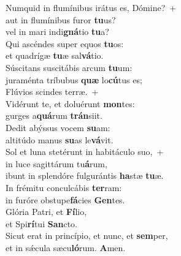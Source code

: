 \evenverse Numquid in flumínibus irátus es, Dómine?~+\\\evenverse  aut in flumínibus furor \textbf{tu}us?~\*\\
\evenverse vel in mari indi\textbf{gná}tio \textbf{tu}a?\\
\oddverse Qui ascéndes super equos \textbf{tu}os:~\*\\
\oddverse et quadrígæ \textbf{tu}æ sal\textbf{vá}tio.\\
\evenverse Súscitans suscitábis arcum \textbf{tu}um:~\*\\
\evenverse juraménta tríbubus \textbf{quæ} lo\textbf{cú}tus es;\\
\oddverse Flúvios scindes terræ.~+\\
\oddverse  Vidérunt te, et doluérunt \textbf{mon}tes:~\*\\
\oddverse gurges a\textbf{quá}rum \textbf{trán}siit.\\
\evenverse Dedit abýssus vocem \textbf{su}am:~\*\\
\evenverse altitúdo manus \textbf{su}as le\textbf{vá}vit.\\
\oddverse Sol et luna stetérunt in habitáculo suo,~+\\
\oddverse  in luce sagittárum tu\textbf{á}rum,~\*\\
\oddverse ibunt in splendóre fulgurántis \textbf{ha}stæ \textbf{tu}æ.\\
\evenverse In frémitu conculcábis \textbf{ter}ram:~\*\\
\evenverse in furóre obstupe\textbf{fá}cies \textbf{Gen}tes.\\
\oddverse Glória Patri, et \textbf{Fí}lio,~\*\\
\oddverse et Spi\textbf{rí}tui \textbf{San}cto.\\
\evenverse Sicut erat in princípio, et nunc, et \textbf{sem}per,~\*\\
\evenverse et in sǽcula sæcu\textbf{ló}rum. \textbf{A}men.\\
